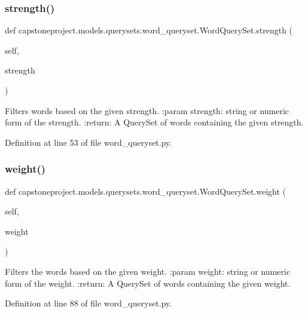 \subsubsection{\texorpdfstring{strength()}{strength()}}
{\footnotesize\ttfamily def capstoneproject.\+models.\+querysets.\+word\+\_\+queryset.\+Word\+Query\+Set.\+strength (\begin{DoxyParamCaption}\item[{}]{self,  }\item[{}]{strength }\end{DoxyParamCaption})}

\begin{DoxyVerb}Filters words based on the given strength.
:param strength: string or numeric form of the strength.
:return: A QuerySet of words containing the given strength.
\end{DoxyVerb}
 

Definition at line 53 of file word\+\_\+queryset.\+py.

\mbox{\label{classcapstoneproject_1_1models_1_1querysets_1_1word__queryset_1_1_word_query_set_a607efd6f48c5fbf86b8c68166049ccd3}} 
\subsubsection{\texorpdfstring{weight()}{weight()}}
{\footnotesize\ttfamily def capstoneproject.\+models.\+querysets.\+word\+\_\+queryset.\+Word\+Query\+Set.\+weight (\begin{DoxyParamCaption}\item[{}]{self,  }\item[{}]{weight }\end{DoxyParamCaption})}

\begin{DoxyVerb}Filters the words based on the given weight.
:param weight: string or numeric form of the weight.
:return: A QuerySet of words containing the given weight.
\end{DoxyVerb}
 

Definition at line 88 of file word\+\_\+queryset.\+py.

